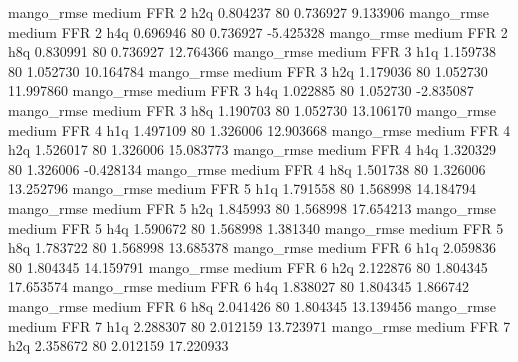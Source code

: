        mango_rmse     medium      FFR                 2                  h2q  0.804237 80       0.736927           9.133906
       mango_rmse     medium      FFR                 2                  h4q  0.696946 80       0.736927          -5.425328
       mango_rmse     medium      FFR                 2                  h8q  0.830991 80       0.736927          12.764366
       mango_rmse     medium      FFR                 3                  h1q  1.159738 80       1.052730          10.164784
       mango_rmse     medium      FFR                 3                  h2q  1.179036 80       1.052730          11.997860
       mango_rmse     medium      FFR                 3                  h4q  1.022885 80       1.052730          -2.835087
       mango_rmse     medium      FFR                 3                  h8q  1.190703 80       1.052730          13.106170
       mango_rmse     medium      FFR                 4                  h1q  1.497109 80       1.326006          12.903668
       mango_rmse     medium      FFR                 4                  h2q  1.526017 80       1.326006          15.083773
       mango_rmse     medium      FFR                 4                  h4q  1.320329 80       1.326006          -0.428134
       mango_rmse     medium      FFR                 4                  h8q  1.501738 80       1.326006          13.252796
       mango_rmse     medium      FFR                 5                  h1q  1.791558 80       1.568998          14.184794
       mango_rmse     medium      FFR                 5                  h2q  1.845993 80       1.568998          17.654213
       mango_rmse     medium      FFR                 5                  h4q  1.590672 80       1.568998           1.381340
       mango_rmse     medium      FFR                 5                  h8q  1.783722 80       1.568998          13.685378
       mango_rmse     medium      FFR                 6                  h1q  2.059836 80       1.804345          14.159791
       mango_rmse     medium      FFR                 6                  h2q  2.122876 80       1.804345          17.653574
       mango_rmse     medium      FFR                 6                  h4q  1.838027 80       1.804345           1.866742
       mango_rmse     medium      FFR                 6                  h8q  2.041426 80       1.804345          13.139456
       mango_rmse     medium      FFR                 7                  h1q  2.288307 80       2.012159          13.723971
       mango_rmse     medium      FFR                 7                  h2q  2.358672 80       2.012159          17.220933
